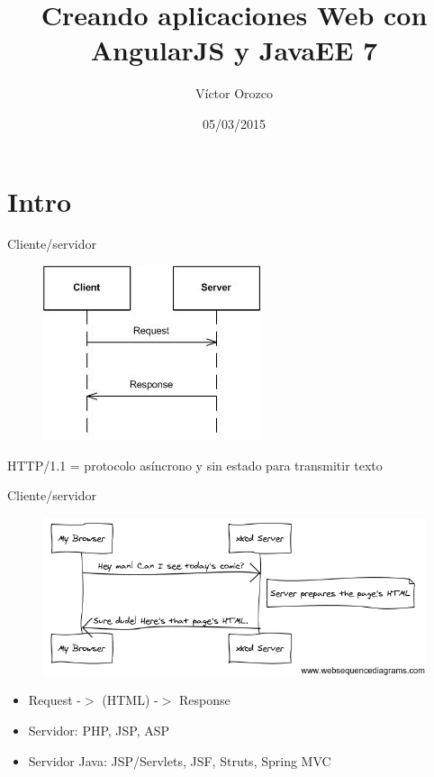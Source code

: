 \documentclass{beamer}
\title{Creando aplicaciones Web con AngularJS y JavaEE 7}
\author{Víctor Orozco}
\institute{Nabenik}
\date{05/03/2015}
\begin{document}
\frame{\titlepage}

\section{Intro}

\begin{frame}{Cliente/servidor}
\begin{figure}
\centering
\includegraphics[width=0.5\linewidth]{Images/requestresponse}
\label{fig:requestresponse}
\end{figure}
\pause HTTP/1.1 = protocolo asíncrono y sin estado para transmitir texto
\end{frame}

\begin{frame}{Cliente/servidor}
	\begin{figure}
	\centering
	\includegraphics[width=0.8\linewidth]{Images/http-xkcd}
	\label{fig:http-xkcd}
	\end{figure}
	\pause
	\begin{itemize}
	\item Request -$>$ (HTML) -$>$ Response
	\item Servidor: PHP, JSP, ASP
	\item Servidor Java: JSP/Servlets, JSF, Struts, Spring MVC
	\end{itemize}
\end{frame}
\end{document}
